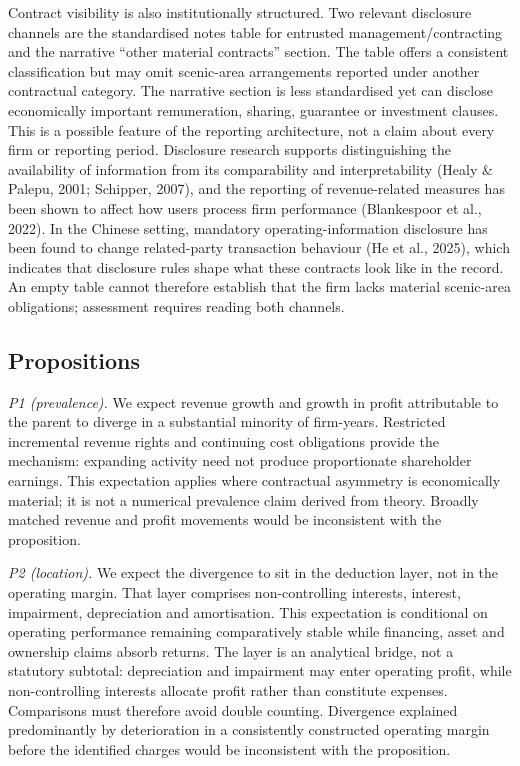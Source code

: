 \documentclass[review,3p,times]{elsarticle}
\begin{document}
Contract visibility is also institutionally structured. Two relevant disclosure channels are the standardised notes table for entrusted management/contracting and the narrative ``other material contracts'' section. The table offers a consistent classification but may omit scenic-area arrangements reported under another contractual category. The narrative section is less standardised yet can disclose economically important remuneration, sharing, guarantee or investment clauses. This is a possible feature of the reporting architecture, not a claim about every firm or reporting period. Disclosure research supports distinguishing the availability of information from its comparability and interpretability (Healy \& Palepu, 2001; Schipper, 2007), and the reporting of revenue-related measures has been shown to affect how users process firm performance (Blankespoor et al., 2022). In the Chinese setting, mandatory operating-information disclosure has been found to change related-party transaction behaviour (He et al., 2025), which indicates that disclosure rules shape what these contracts look like in the record. An empty table cannot therefore establish that the firm lacks material scenic-area obligations; assessment requires reading both channels.

\subsection{Propositions}

\emph{P1 (prevalence).} We expect revenue growth and growth in profit attributable to the parent to diverge in a substantial minority of firm-years. Restricted incremental revenue rights and continuing cost obligations provide the mechanism: expanding activity need not produce proportionate shareholder earnings. This expectation applies where contractual asymmetry is economically material; it is not a numerical prevalence claim derived from theory. Broadly matched revenue and profit movements would be inconsistent with the proposition.

\emph{P2 (location).} We expect the divergence to sit in the deduction layer, not in the operating margin. That layer comprises non-controlling interests, interest, impairment, depreciation and amortisation. This expectation is conditional on operating performance remaining comparatively stable while financing, asset and ownership claims absorb returns. The layer is an analytical bridge, not a statutory subtotal: depreciation and impairment may enter operating profit, while non-controlling interests allocate profit rather than constitute expenses. Comparisons must therefore avoid double counting. Divergence explained predominantly by deterioration in a consistently constructed operating margin before the identified charges would be inconsistent with the proposition.
\end{document}
